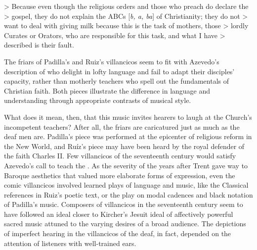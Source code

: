 > Because even though the religious orders and those who preach do declare the > gospel, they do not explain the ABCs [\emph{b, a, ba}] of Christianity; they do not > want to deal with giving milk because this is the task of mothers, those > lordly Curates or Orators, who are responsible for this task, and what I have > described is their fault.
\Autocite[27:  .]{Azevedo:Catecismo}

The friars of Padilla's and Ruiz's villancicos seem to fit with Azevedo's description of  who delight in lofty language and fail to adapt their disciples' capacity, rather than motherly teachers who spell out the fundamentals of Christian faith.
Both pieces illustrate the difference in language and understanding through appropriate contrasts of musical style.

What does it mean, then, that this music invites hearers to laugh at the Church's incompetent teachers? After all, the friars are caricatured just as much as the deaf men are.
Padilla's piece was performed at the epicenter of religious reform in the New World, and Ruíz's piece may have been heard by the royal defender of the faith Charles II.  %
Few villancicos of the seventeenth century would satisfy Azevedo's call to teach the .
As the severity of the years after Trent gave way to Baroque aesthetics that valued more elaborate forms of expression, even the comic villancicos involved learned plays of language and music, like the Classical references in Ruiz's poetic text, or the play on modal cadences and black notation of Padilla's music.
Composers of villancicos in the seventeenth century seem to have followed an ideal closer to Kircher's Jesuit ideal of affectively powerful sacred music attuned to the varying desires of a broad audience.
The depictions of imperfect hearing in the villancicos of the deaf, in fact, depended on the attention of listeners with well-trained ears.


